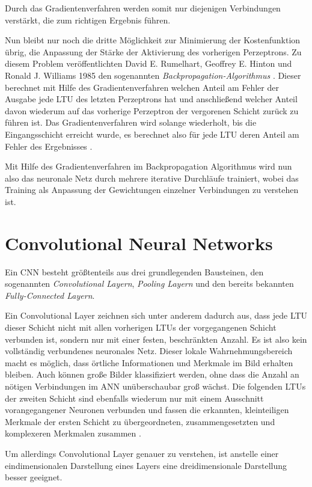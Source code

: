 Durch das Gradientenverfahren werden somit nur diejenigen Verbindungen verstärkt, die zum richtigen Ergebnis führen. 

Nun bleibt nur noch die dritte Möglichkeit zur Minimierung der Kostenfunktion übrig, die Anpassung der Stärke der Aktivierung des vorherigen Perzeptrons. Zu diesem Problem veröffentlichten David E. Rumelhart, Geoffrey E. Hinton und Ronald J. Williams 1985 den sogenannten \textit{Backpropagation-Algorithmus} \cite{DavidE.Rumelhart.September1985}. Dieser berechnet mit Hilfe des Gradientenverfahren welchen Anteil am Fehler der Ausgabe jede LTU des letzten Perzeptrons hat und anschließend welcher Anteil davon wiederum auf das vorherige Perzeptron der vergorenen Schicht zurück zu führen ist. Das Gradientenverfahren wird solange wiederholt, bis die Eingangsschicht erreicht wurde, es berechnet also für jede LTU deren Anteil am Fehler des Ergebnisses \cite{AurelienGeron.2018}.

Mit Hilfe des Gradientenverfahren im Backpropagation Algorithmus wird nun also das neuronale Netz durch mehrere iterative Durchläufe trainiert, wobei das Training als Anpassung der Gewichtungen einzelner Verbindungen zu verstehen ist.

\section*{Convolutional Neural Networks}

Ein CNN besteht größtenteils aus drei grundlegenden Bausteinen, den sogenannten \textit{Convolutional Layern}, \textit{Pooling Layern} und den bereits bekannten \textit{Fully-Connected Layern}.

Ein Convolutional Layer zeichnen sich unter anderem dadurch aus, dass jede LTU dieser Schicht nicht mit allen vorherigen LTUs der vorgegangenen Schicht verbunden ist, sondern nur mit einer festen, beschränkten Anzahl. Es ist also kein vollständig verbundenes neuronales Netz. Dieser \glqq lokale Wahrnehmungsbereich\grqq{} macht es möglich, dass örtliche Informationen und Merkmale im Bild erhalten bleiben. Auch können große Bilder klassifiziert werden, ohne dass die Anzahl an nötigen Verbindungen im ANN unüberschaubar groß wächst. Die folgenden LTUs der zweiten Schicht sind ebenfalls wiederum nur mit einem Ausschnitt vorangegangener Neuronen verbunden und fassen die erkannten, kleinteiligen Merkmale der ersten Schicht zu übergeordneten, zusammengesetzten und komplexeren Merkmalen zusammen \cite{AurelienGeron.2018}.

Um allerdings Convolutional Layer genauer zu verstehen, ist anstelle einer eindimensionalen Darstellung eines Layers eine dreidimensionale Darstellung besser geeignet.

